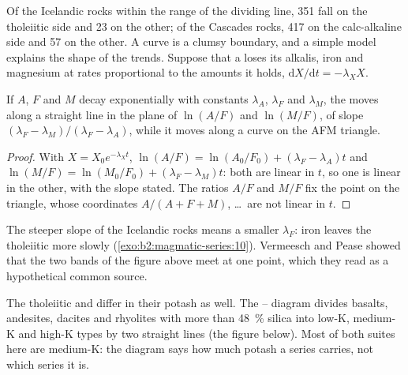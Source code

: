 Of the Icelandic rocks within the range of the dividing line, 351 fall on the
tholeiitic side and 23 on the other; of the Cascades rocks, 417 on the calc-alkaline
side and 57 on the other. A curve is a clumsy boundary, and a simple model explains
the shape of the trends. Suppose that a  loses its alkalis, iron and magnesium
at rates proportional to the amounts it holds, $\mathrm dX/\mathrm dt = -\lambda_X X$.

\begin{proposition}\label{prop:b2:magmatic-series:logratio}
If $A$, $F$ and $M$ decay exponentially with constants $\lambda_A$, $\lambda_F$ and
$\lambda_M$, the  moves along a straight line in the plane of $\ln(A/F)$ and
$\ln(M/F)$, of slope $(\lambda_F - \lambda_M)/(\lambda_F - \lambda_A)$, while it moves
along a curve on the AFM triangle.
\end{proposition}

\begin{proof}
With $X = X_0 e^{-\lambda_X t}$, $\ln(A/F) = \ln(A_0/F_0) + (\lambda_F - \lambda_A)t$
and $\ln(M/F) = \ln(M_0/F_0) + (\lambda_F - \lambda_M)t$: both are linear in $t$, so
one is linear in the other, with the slope stated. The ratios $A/F$ and $M/F$ fix the
point on the triangle, whose coordinates $A/(A + F + M)$, \dots\ are not linear in $t$.
\end{proof}

The steeper slope of the Icelandic rocks means a smaller $\lambda_F$: iron leaves
the tholeiitic  more slowly (\cref{exo:b2:magmatic-series:10}). Vermeesch and Pease showed that the two
bands of the figure above meet at one point, which they read as a hypothetical common
source.

The tholeiitic and  differ in their potash as well. The
-- diagram divides basalts, andesites, dacites and rhyolites with
more than \qty{48}{\percent} silica into low-K, medium-K and high-K types by two
straight lines (the figure below). Most of both suites here are medium-K: the
diagram says how much potash a series carries, not which series it is.

